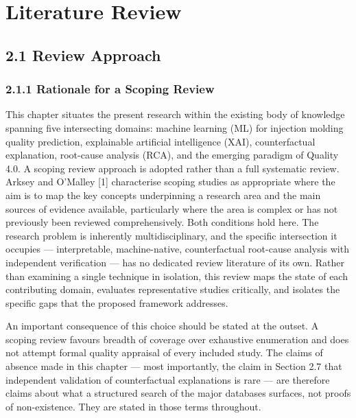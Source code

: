 \hypertarget{literature-review}{%
\chapter{Literature Review}\label{literature-review}}

\hypertarget{review-approach}{%
\section{2.1 Review Approach}\label{review-approach}}

\hypertarget{rationale-for-a-scoping-review}{%
\subsection{2.1.1 Rationale for a Scoping Review}\label{rationale-for-a-scoping-review}}

This chapter situates the present research within the existing body of knowledge spanning five intersecting domains: machine learning (ML) for injection molding quality prediction, explainable artificial intelligence (XAI), counterfactual explanation, root-cause analysis (RCA), and the emerging paradigm of Quality 4.0. A scoping review approach is adopted rather than a full systematic review. Arksey and O'Malley {[}1{]} characterise scoping studies as appropriate where the aim is to map the key concepts underpinning a research area and the main sources of evidence available, particularly where the area is complex or has not previously been reviewed comprehensively. Both conditions hold here. The research problem is inherently multidisciplinary, and the specific intersection it occupies --- interpretable, machine-native, counterfactual root-cause analysis with independent verification --- has no dedicated review literature of its own. Rather than examining a single technique in isolation, this review maps the state of each contributing domain, evaluates representative studies critically, and isolates the specific gaps that the proposed framework addresses.

An important consequence of this choice should be stated at the outset. A scoping review favours breadth of coverage over exhaustive enumeration and does not attempt formal quality appraisal of every included study. The claims of absence made in this chapter --- most importantly, the claim in Section 2.7 that independent validation of counterfactual explanations is rare --- are therefore claims about what a structured search of the major databases surfaces, not proofs of non-existence. They are stated in those terms throughout.

